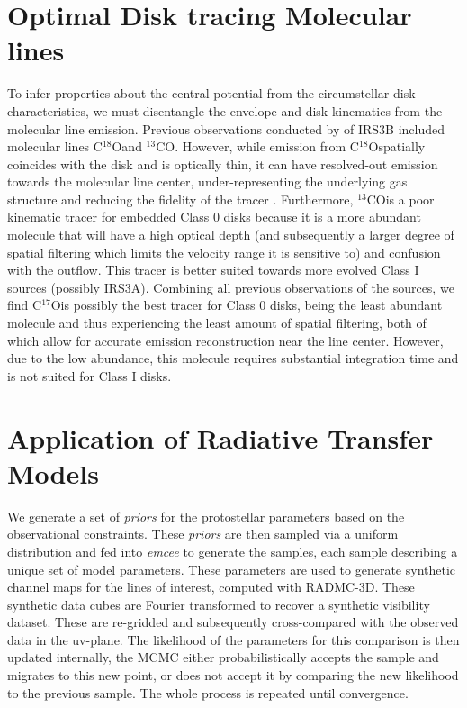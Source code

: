 \documentclass[twocolumn, 12pt]{aastex63}
\newcommand{\ceo}{C$^{18}$O}
\newcommand{\tco}{$^{13}$CO}
\newcommand{\cso}{C$^{17}$O}
\begin{document}
\section{Optimal Disk tracing Molecular lines}
To infer properties about the central potential from the circumstellar disk characteristics, we must disentangle the envelope and disk kinematics from the molecular line emission. Previous observations conducted by \citet{2016Natur.538..483T}\space of IRS3B included molecular lines \ceo\space and \tco. However, while emission from \ceo\space spatially coincides with the disk and is optically thin, it can have resolved-out emission towards the molecular line center, under-representing the underlying gas structure and reducing the fidelity of the tracer \citep{2020MNRAS.493L.108B}. Furthermore, \tco\space is a poor kinematic tracer for embedded Class 0 disks because it is a more abundant molecule that will have a high optical depth (and subsequently a larger degree of spatial filtering which limits the velocity range it is sensitive to) and confusion with the outflow. This tracer is better suited towards more evolved Class I sources (possibly IRS3A). Combining all previous observations of the sources, we find \cso\space is possibly the best tracer for Class 0 disks, being the least abundant molecule and thus experiencing the least amount of spatial filtering, both of which allow for accurate emission reconstruction near the line center. However, due to the low abundance, this molecule requires substantial integration time and is not suited for Class I disks.


\section{Application of Radiative Transfer Models}\label{sec:apppdspy}
We generate a set of \textit{priors} for the protostellar parameters based on the observational constraints. These \textit{priors} are then sampled via a uniform distribution and fed into \textit{emcee} to generate the samples, each sample describing a unique set of model parameters. These parameters are used to generate synthetic channel maps for the lines of interest, computed with RADMC-3D. These synthetic data cubes are Fourier transformed to recover a synthetic visibility dataset. These are re-gridded and subsequently cross-compared with the observed data in the uv-plane. The likelihood of the parameters for this comparison is then updated internally, the MCMC either probabilistically accepts the sample and migrates to this new point, or does not accept it by comparing the new likelihood to the previous sample. The whole process is repeated until convergence.
\end{document}
